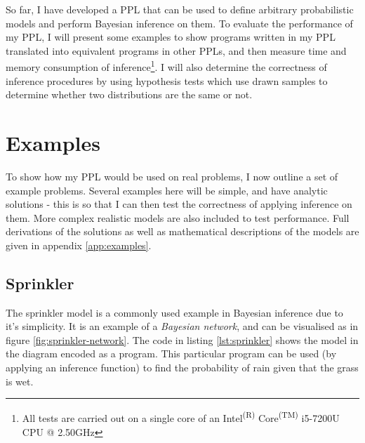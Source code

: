 



So far, I have developed a PPL that can be used to define arbitrary probabilistic models and perform Bayesian inference on them. To evaluate the performance of my PPL, I will present some examples to show programs written in my PPL translated into equivalent programs in other PPLs, and then measure time and memory consumption of inference\footnote{All tests are carried out on a single core of an Intel\textsuperscript{(R)} Core\textsuperscript{(TM)} i5-7200U CPU @ 2.50GHz}. I will also determine the correctness of inference procedures by using hypothesis tests which use drawn samples to determine whether two distributions are the same or not.

\section{Examples}
To show how my PPL would be used on real problems, I now outline a set of example problems. Several examples here will be simple, and have analytic solutions - this is so that I can then test the correctness of applying inference on them. More complex realistic models are also included to test performance. Full derivations of the solutions as well as mathematical descriptions of the models are given in appendix \ref{app:examples}.

\subsection{Sprinkler}
The sprinkler model is a commonly used example in Bayesian inference due to it's simplicity. It is an example of a \textit{Bayesian network}, and can be visualised as in figure \ref{fig:sprinkler-network}. The code in listing \ref{lst:sprinkler} shows the model in the diagram encoded as a program. This particular program can be used (by applying an inference function) to find the probability of rain given that the grass is wet.

